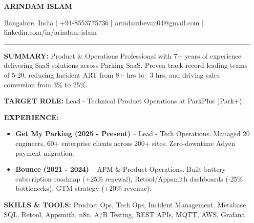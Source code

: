 \documentclass[a4paper,10pt]{article}
\begin{document}
\centerline{\Large \bfseries ARINDAM ISLAM}
\centerline{Bangalore, India | +91-8553775736 | arindambevan04@gmail.com | linkedin.com/in/arindam-islam}
\vspace{2mm}
\hrule
\vspace{2mm}
\textbf{SUMMARY:} Product \& Operations Professional with 7+ years of experience delivering SaaS solutions across Parking SaaS. Proven track record leading teams of 5-20, reducing Incident ART from 8+ hrs to ~3 hrs, and driving sales conversion from 3\% to 25\%.

\vspace{2mm}
\textbf{TARGET ROLE:} Lead - Technical Product Operations at ParkPlus (Park+)

\vspace{2mm}
\textbf{EXPERIENCE:}
\begin{itemize}
  \item \textbf{Get My Parking (2025 - Present)} -- Lead - Tech Operations. Managed 20 engineers, 60+ enterprise clients across 200+ sites. Zero-downtime Adyen payment migration.
  \item \textbf{Bounce (2021 - 2024)} -- APM \& Product Operations. Built battery subscription roadmap (+25\% renewal), Retool/Appsmith dashboards (-25\% bottlenecks), GTM strategy (+20\% revenue).
\end{itemize}

\vspace{2mm}
\textbf{SKILLS \& TOOLS:} Product Ops, Tech Ops, Incident Management, Metabase SQL, Retool, Appsmith, n8n, A/B Testing, REST APIs, MQTT, AWS, Grafana.
\end{document}
